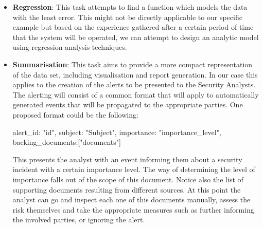 \documentclass[12pt]{article}
\newcounter{subsubsubsection}[subsubsection]
\begin{document}
\begin{itemize}
\item
\textbf{Regression}: This task attempts to find a function which models the data with the least error.
This might not be directly applicable to our specific example but based on the experience
gathered after a certain period of time that the system will be operated, we can attempt to
design an analytic model using regression analysis techniques.
\item
\textbf{Summarisation}: This task aims to provide a more compact representation of the data set, including visualisation and report generation. In our case this applies to the creation of the alerts to be presented to the Security Analysts. The alerting will consist of a common format that will apply to automatically generated events that will be propagated to the appropriate parties. One proposed format could be the following:
\begin{spverbatim}
{alert_id: "id", subject: "Subject", importance: "importance_level", backing_documents:["documents"]}
\end{spverbatim}
This presents the analyst with an event informing them about a security incident with a certain importance level. The way of determining the level of importance falls out of the scope of this document. Notice also the list of supporting documents resulting from different sources. At this point the analyst can go and inspect each one of this documents manually, assess the risk themselves and take the appropriate measures such as further informing the involved parties, or ignoring the alert.
\end{itemize}
\newpage
{}
\end{document}
